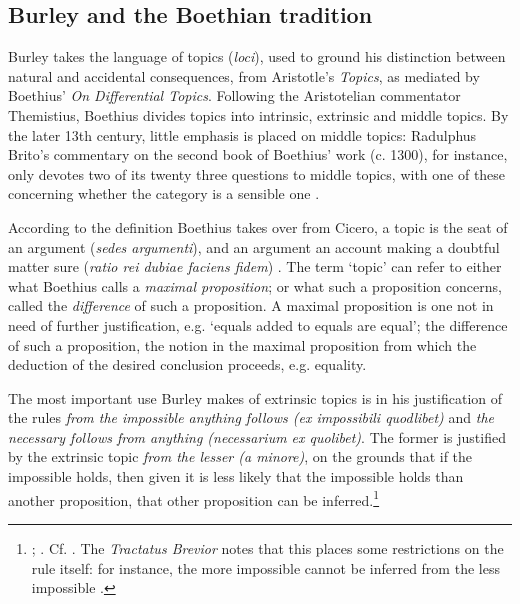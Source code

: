 	\subsection{Burley and the Boethian tradition}
	Burley takes the language of topics (\textit{loci}), used to ground his distinction between natural and accidental consequences, from Aristotle's \textit{Topics}, as mediated by Boethius' \textit{On Differential Topics}. Following the Aristotelian commentator Themistius, Boethius divides topics into intrinsic, extrinsic and middle topics. By the later 13th century, little emphasis is placed on middle topics: Radulphus Brito's commentary on the second book of Boethius' work (c. 1300), for instance, only devotes two of its twenty three questions to middle topics, with one of these concerning whether the category is a sensible one \autocite{BritoDDT}.
	
	According to the definition Boethius takes over from Cicero, a topic is the seat of an argument (\textit{sedes argumenti}), and an argument an account making a doubtful matter sure (\textit{ratio rei dubiae faciens fidem}) \autocite[p. 1048]{BTC}. The term `topic' can refer to either what Boethius calls a \textit{maximal proposition}; or what such a proposition concerns, called the \textit{difference} of such a proposition. A maximal proposition is one not in need of further justification, e.g. `equals added to equals are equal'; the difference of such a proposition, the notion in the maximal proposition from which the deduction of the desired conclusion proceeds, e.g. equality.
	
	The most important use Burley makes of extrinsic topics is in his justification of the rules \textit{from the impossible anything follows (ex impossibili quodlibet)} and \textit{the necessary follows from anything (necessarium ex quolibet)}. The former is justified by the extrinsic topic \textit{from the lesser (a minore)}, on the grounds that if the impossible holds, then given it is less likely that the impossible holds than another proposition, that other proposition can be inferred.\footnote{\cite[pp. 128-129, par. 70]{Green-Pedersen1980b}; \cite[p. 61]{BurleyDPAL}. Cf. \autocite[III-3. 38, pp. 727-731]{OckhamSL}. The \textit{Tractatus Brevior} notes that this places some restrictions on the rule itself: for instance, the more impossible cannot be inferred from the less impossible \autocite[pp. 248.19-249.3]{BurleyDPAL}.}
	
